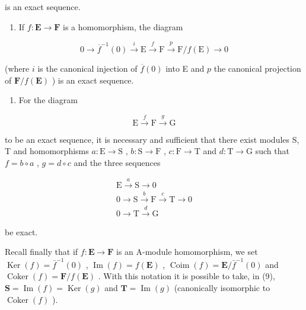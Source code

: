 is an exact sequence.

\begin{enumerate}
\def\labelenumi{(\alph{enumi})}
\setcounter{enumi}{4}
\tightlist
\item
  If \(f: \mathbf{E} \to \mathbf{F}\) is a homomorphism, the diagram
\end{enumerate}

\[
0 \longrightarrow \overline {{f}} ^ {- 1} (0) \stackrel {i} {\longrightarrow} \mathrm{E} \stackrel {f} {\longrightarrow} \mathrm{F} \stackrel {p} {\longrightarrow} \mathrm{F} / f (\mathrm{E}) \longrightarrow 0\tag{7}
\]

(where \(i\) is the canonical injection of \(\overline{f}(0)\) into E and \(p\) the canonical projection of \(\mathbf{F} / f(\mathbf{E})\) ) is an exact sequence.

\begin{enumerate}
\def\labelenumi{(\alph{enumi})}
\setcounter{enumi}{5}
\tightlist
\item
  For the diagram
\end{enumerate}

\[
\mathrm{E} \xrightarrow {f} \mathrm{F} \xrightarrow {g} \mathrm{G}\tag{8}
\]

to be an exact sequence, it is necessary and sufficient that there exist modules S, T and homomorphisms \(a: \mathrm{E} \to \mathrm{S}\) , \(b: \mathrm{S} \to \mathrm{F}\) , \(c: \mathrm{F} \to \mathrm{T}\) and \(d: \mathrm{T} \to \mathrm{G}\) such that \(f = b \circ a\) , \(g = d \circ c\) and the three sequences

\[
\begin{array}{c} \mathrm{E} \xrightarrow {a} \mathrm{S} \longrightarrow 0 \\ 0 \longrightarrow \mathrm{S} \xrightarrow {b} \mathrm{F} \xrightarrow {c} \mathrm{T} \longrightarrow 0 \\ 0 \longrightarrow \mathrm{T} \xrightarrow {d} \mathrm{G} \end{array}\tag{9}
\]

be exact.

Recall finally that if \(f: \mathbf{E} \to \mathbf{F}\) is an A-module homomorphism, we set \(\operatorname{Ker}(f) = \bar{f}^{-1}(0)\) , \(\operatorname{Im}(f) = f(\mathbf{E})\) , \(\operatorname{Coim}(f) = \mathbf{E} / \bar{f}^{-1}(0)\) and \(\operatorname{Coker}(f) = \mathbf{F} / f(\mathbf{E})\) . With this notation it is possible to take, in (9), \(\mathbf{S} = \operatorname{Im}(f) = \operatorname{Ker}(g)\) and \(\mathbf{T} = \operatorname{Im}(g)\) (canonically isomorphic to \(\operatorname{Coker}(f)\) ).

